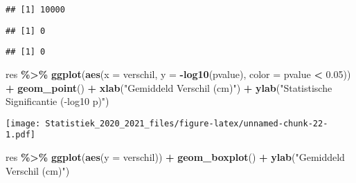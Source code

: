 \documentclass[
  12pt,dutch,coursenotes]{book}
\newenvironment{Shaded}{\begin{snugshade}}{\end{snugshade}}
\newcommand{\DataTypeTok}[1]{\textcolor[rgb]{0.13,0.29,0.53}{#1}}
\newcommand{\DecValTok}[1]{\textcolor[rgb]{0.00,0.00,0.81}{#1}}
\newcommand{\FloatTok}[1]{\textcolor[rgb]{0.00,0.00,0.81}{#1}}
\newcommand{\KeywordTok}[1]{\textcolor[rgb]{0.13,0.29,0.53}{\textbf{#1}}}
\newcommand{\NormalTok}[1]{#1}
\newcommand{\OperatorTok}[1]{\textcolor[rgb]{0.81,0.36,0.00}{\textbf{#1}}}
\newcommand{\StringTok}[1]{\textcolor[rgb]{0.31,0.60,0.02}{#1}}
\theoremstyle{definition}
\theoremstyle{definition}
\theoremstyle{definition}
\theoremstyle{remark}
\begin{document}
\begin{verbatim}
## [1] 10000
\end{verbatim}

\begin{Shaded}
\end{Shaded}

\begin{verbatim}
## [1] 0
\end{verbatim}

\begin{Shaded}
\end{Shaded}

\begin{verbatim}
## [1] 0
\end{verbatim}

\begin{Shaded}
\begin{Highlighting}[]
\NormalTok{res }\OperatorTok{\%\textgreater{}\%}\StringTok{ }\KeywordTok{ggplot}\NormalTok{(}\KeywordTok{aes}\NormalTok{(}\DataTypeTok{x =}\NormalTok{ verschil, }\DataTypeTok{y =} \OperatorTok{{-}}\KeywordTok{log10}\NormalTok{(pvalue), }
    \DataTypeTok{color =}\NormalTok{ pvalue }\OperatorTok{\textless{}}\StringTok{ }\FloatTok{0.05}\NormalTok{)) }\OperatorTok{+}\StringTok{ }\KeywordTok{geom\_point}\NormalTok{() }\OperatorTok{+}\StringTok{ }\KeywordTok{xlab}\NormalTok{(}\StringTok{"Gemiddeld Verschil (cm)"}\NormalTok{) }\OperatorTok{+}\StringTok{ }
\StringTok{    }\KeywordTok{ylab}\NormalTok{(}\StringTok{"Statistische Significantie ({-}log10 p)"}\NormalTok{)}
\end{Highlighting}
\end{Shaded}

\texttt{[image: Statistiek\_2020\_2021\_files/figure-latex/unnamed-chunk-22-1.pdf]}

\begin{Shaded}
\begin{Highlighting}[]
\NormalTok{res }\OperatorTok{\%\textgreater{}\%}\StringTok{ }\KeywordTok{ggplot}\NormalTok{(}\KeywordTok{aes}\NormalTok{(}\DataTypeTok{y =}\NormalTok{ verschil)) }\OperatorTok{+}\StringTok{ }\KeywordTok{geom\_boxplot}\NormalTok{() }\OperatorTok{+}\StringTok{ }
\StringTok{    }\KeywordTok{ylab}\NormalTok{(}\StringTok{"Gemiddeld Verschil (cm)"}\NormalTok{)}
\end{Highlighting}
\end{Shaded}
\end{document}
